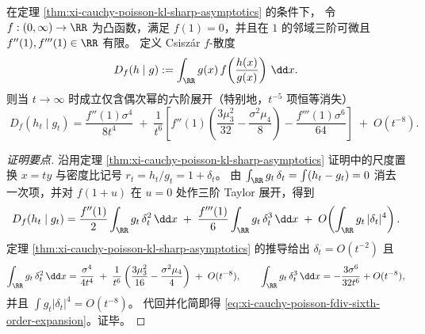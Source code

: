 \begin{proposition}\label{prop:xi-cauchy-poisson-fdiv-sixth-order-expansion}
在定理 \ref{thm:xi-cauchy-poisson-kl-sharp-asymptotics} 的条件下，
令 \(f:(0,\infty)\to\RR\) 为凸函数，满足 \(f(1)=0\)，并且在 \(1\) 的邻域三阶可微且 \(f''(1),f'''(1)\in\RR\) 有限。
定义 Csisz\'ar \texorpdfstring{$f$}{f}-散度
\[
D_f(h\mid g):=\int_{\RR} g(x)\,f\!\left(\frac{h(x)}{g(x)}\right)\,\dd x.
\]
则当 \(t\to\infty\) 时成立仅含偶次幂的六阶展开（特别地，\(t^{-5}\) 项恒等消失）
\begin{equation}\label{eq:xi-cauchy-poisson-fdiv-sixth-order-expansion}
\boxed{\;
D_f(h_t\mid g_t)
=\frac{f''(1)\sigma^4}{8t^4}
\;+\;\frac{1}{t^6}\left[
f''(1)\left(\frac{3\mu_3^2}{32}-\frac{\sigma^2\mu_4}{8}\right)
-\frac{f'''(1)\sigma^6}{64}
\right]
\;+\;O(t^{-8}).\;}
\end{equation}
\end{proposition}
\begin{proof}[证明要点]
沿用定理 \ref{thm:xi-cauchy-poisson-kl-sharp-asymptotics} 证明中的尺度置换 \(x=ty\) 与密度比记号 \(r_t=h_t/g_t=1+\delta_t\)。
由 \(\int_{\RR}g_t\,\delta_t=\int(h_t-g_t)=0\) 消去一次项，并对 \(f(1+u)\) 在 \(u=0\) 处作三阶 Taylor 展开，得到
\[
D_f(h_t\mid g_t)
=\frac{f''(1)}{2}\int_{\RR} g_t\,\delta_t^2\,\dd x
\;+\;\frac{f'''(1)}{6}\int_{\RR} g_t\,\delta_t^3\,\dd x
\;+\;O\!\left(\int_{\RR} g_t\,|\delta_t|^4\right).
\]
定理 \ref{thm:xi-cauchy-poisson-kl-sharp-asymptotics} 的推导给出 \(\delta_t=O(t^{-2})\) 且
\[
\int_{\RR} g_t\,\delta_t^2\,\dd x=\frac{\sigma^4}{4t^4}
\;+\;\frac{1}{t^6}\left(\frac{3\mu_3^2}{16}-\frac{\sigma^2\mu_4}{4}\right)
\;+\;O(t^{-8}),
\qquad
\int_{\RR} g_t\,\delta_t^3\,\dd x=-\frac{3\sigma^6}{32t^6}+O(t^{-8}),
\]
并且 \(\int g_t|\delta_t|^4=O(t^{-8})\)。
代回并化简即得 \eqref{eq:xi-cauchy-poisson-fdiv-sixth-order-expansion}。证毕。
\end{proof}

